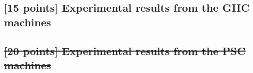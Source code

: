 \documentclass[letterpaper,11pt]{exam}
\begin{document}
\begin{questions}
\begin{enumerate}[label=\roman*.]



    \end{enumerate}

    \question
    \subsection*{[15 points] Experimental results from the GHC machines}

    \question
    \subsection*{\sout{[20 points] Experimental results from the PSC machines}}


\end{questions}
\end{document}
